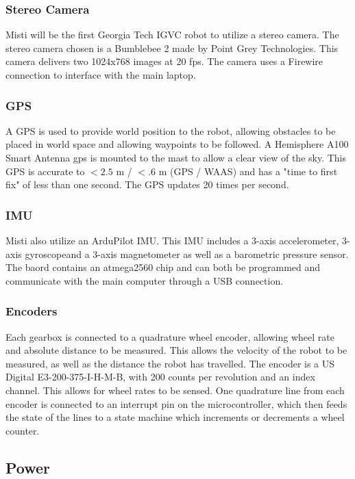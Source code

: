 \subsubsection{Stereo Camera}

Misti will be the first Georgia Tech IGVC robot to utilize a stereo camera. The stereo camera chosen is a Bumblebee 2 made by Point Grey Technologies. This camera delivers two 1024x768 images at 20 fps. The camera uses a Firewire connection to interface with the main laptop. 

\subsubsection{GPS}

A GPS is used to provide world position to the robot, allowing obstacles to be placed in world space and allowing waypoints to be followed. A Hemisphere A100 Smart Antenna gps is mounted to the mast to allow a clear view of the sky. This GPS is accurate to $<2.5$ m / $<.6$ m (GPS / WAAS) and has a "time to first fix" of less than one second. The GPS updates 20 times per second.

\subsubsection{IMU}

Misti also utilize an ArduPilot IMU. This IMU includes a 3-axis accelerometer, 3-axis gyroscopeand a 3-axis magnetometer as well as a barometric pressure sensor. The baord contains an atmega2560 chip and can both be programmed and communicate with the main computer through a USB connection.
 
\subsubsection{Encoders}

Each gearbox is connected to a quadrature wheel encoder, allowing wheel rate and absolute distance to be measured. This allows the velocity of the robot to be measured, as well as the distance the robot has travelled. The encoder is a US Digital E3-200-375-I-H-M-B, with 200 counts per revolution and an index channel. This allows for wheel rates to be sensed. One quadrature line from each encoder is connected to an interrupt pin on the microcontroller, which then feeds the state of the lines to a state machine which increments or decrements a wheel counter.

\subsection {Power}

